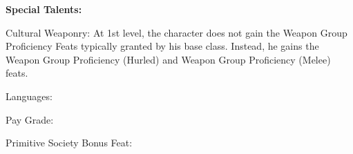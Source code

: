 

\textbf{Special Talents:}
\begin{itemize*}
\item 
\item 
\item 
\item 
\item Cultural Weaponry: At 1st level, the character does not gain the Weapon Group Proficiency Feats typically granted by his base class. Instead, he gains the Weapon Group Proficiency (Hurled) and Weapon Group Proficiency (Melee) feats.
\item Languages:
\item Pay Grade: 
\item Primitive Society Bonus Feat: 
\end{itemize*}

%
%
